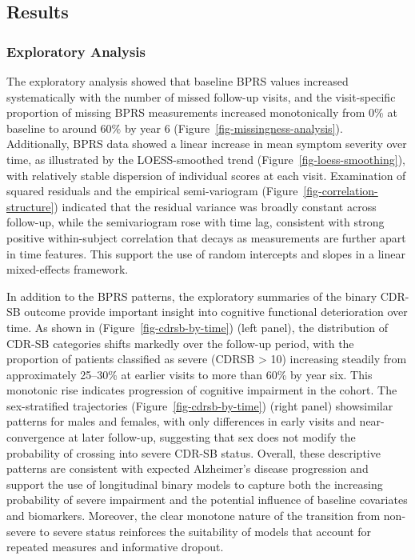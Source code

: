\documentclass[
  9pt,
  letterpaper,
  DIV=11,
  numbers=noendperiod]{scrartcl}
\begin{document}
\subsection{Results}\label{results}

\subsubsection{Exploratory Analysis}\label{exploratory-analysis}

The exploratory analysis showed that baseline BPRS values increased
systematically with the number of missed follow-up visits, and the
visit-specific proportion of missing BPRS measurements increased
monotonically from 0\% at baseline to around 60\% by year 6
(Figure~\ref{fig-missingness-analysis}). Additionally, BPRS data showed
a linear increase in mean symptom severity over time, as illustrated by
the LOESS-smoothed trend (Figure~\ref{fig-loess-smoothing}), with
relatively stable dispersion of individual scores at each visit.
Examination of squared residuals and the empirical semi-variogram
(Figure~\ref{fig-correlation-structure}) indicated that the residual
variance was broadly constant across follow-up, while the semivariogram
rose with time lag, consistent with strong positive within-subject
correlation that decays as measurements are further apart in time
features. This support the use of random intercepts and slopes in a
linear mixed-effects framework.

In addition to the BPRS patterns, the exploratory summaries of the
binary CDR-SB outcome provide important insight into cognitive
functional deterioration over time. As shown in
(Figure~\ref{fig-cdrsb-by-time}) (left panel), the distribution of
CDR-SB categories shifts markedly over the follow-up period, with the
proportion of patients classified as severe (CDRSB \textgreater{} 10)
increasing steadily from approximately 25--30\% at earlier visits to
more than 60\% by year six. This monotonic rise indicates progression of
cognitive impairment in the cohort. The sex-stratified trajectories
(Figure~\ref{fig-cdrsb-by-time}) (right panel) showsimilar patterns for
males and females, with only differences in early visits and
near-convergence at later follow-up, suggesting that sex does not modify
the probability of crossing into severe CDR-SB status. Overall, these
descriptive patterns are consistent with expected Alzheimer's disease
progression and support the use of longitudinal binary models to capture
both the increasing probability of severe impairment and the potential
influence of baseline covariates and biomarkers. Moreover, the clear
monotone nature of the transition from non-severe to severe status
reinforces the suitability of models that account for repeated measures
and informative dropout.
\end{document}
